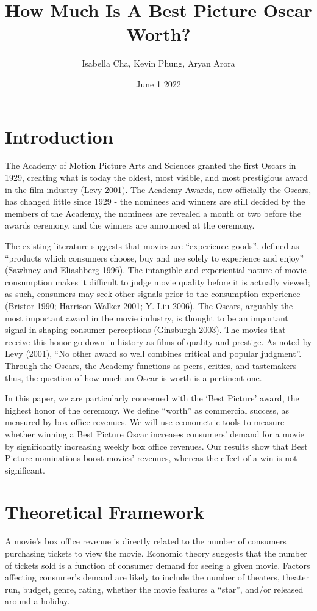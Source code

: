 \documentclass[11pt]{article} %
\begin{document}
\title{How Much Is A Best Picture Oscar Worth?}
\author{Isabella Cha, Kevin Phung, Aryan Arora}
\date{June 1 2022}
\maketitle

\section{Introduction}
The Academy of Motion Picture Arts and Sciences granted the first Oscars in 1929, creating what is today the oldest, most visible, and most prestigious award in the film industry (Levy 2001). The Academy Awards, now officially the Oscars, has changed little since 1929 - the nominees and winners are still decided by the members of the Academy, the nominees are revealed a month or two before the awards ceremony, and the winners are announced at the ceremony.

The existing literature suggests that movies are “experience goods”, defined as “products which consumers choose, buy and use solely to experience and enjoy” (Sawhney and Eliashberg 1996). The intangible and experiential nature of movie consumption makes it difficult to judge movie quality before it is actually viewed; as such, consumers may seek other signals prior to the consumption experience (Bristor 1990; Harrison-Walker 2001; Y. Liu 2006). The Oscars, arguably the most important award in the movie industry, is thought to be an important signal in shaping consumer perceptions (Ginsburgh 2003). The movies that receive this honor go down in history as films of quality and prestige. As noted by Levy (2001), “No other award so well combines critical and popular judgment”. Through the Oscars, the Academy functions as peers, critics, and tastemakers — thus, the question of how much an Oscar is worth is a pertinent one. 

In this paper, we are particularly concerned with the ‘Best Picture’ award, the highest honor of the ceremony. We define “worth” as commercial success, as measured by box office revenues. We will use econometric tools to measure whether winning a Best Picture Oscar increases consumers’ demand for a movie by significantly increasing weekly box office revenues. Our results show that Best Picture nominations boost movies’ revenues, whereas the effect of a win is not significant.  



\section{Theoretical Framework}
A movie’s box office revenue is directly related to the number of consumers purchasing tickets to view the movie. Economic theory suggests that the number of tickets sold is a function of consumer demand for seeing a given movie. Factors affecting consumer’s demand are likely to include the number of theaters, theater run, budget, genre, rating, whether the movie features a “star”, and/or released around a holiday. 
\end{document}
